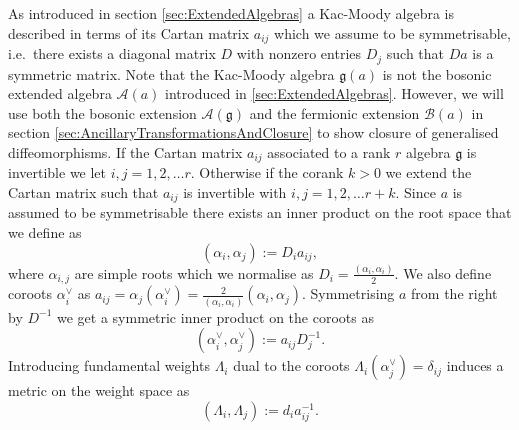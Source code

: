 As introduced in section \ref{sec:ExtendedAlgebras} a Kac-Moody algebra is described in terms of its Cartan matrix $a_{ij}$ which we assume to be symmetrisable, i.e.\ there exists a diagonal matrix $D$ with nonzero entries $D_j$ such that $Da$ is a symmetric matrix. Note that the Kac-Moody algebra $\mathfrak{g}(a)$ is not the bosonic extended algebra $\mathscr{A}(a)$ introduced in \ref{sec:ExtendedAlgebras}. However, we will use both the bosonic extension $\mathscr{A}(\mathfrak{g})$ and the fermionic extension $\mathscr{B}(a)$ in section \ref{sec:AncillaryTransformationsAndClosure} to show closure of generalised diffeomorphisms. If the Cartan matrix $a_{ij}$ associated to a rank $r$ algebra $\mathfrak{g}$ is invertible we let $i,j=1,2,\ldots r$. Otherwise if the corank $k>0$ we extend the Cartan matrix such that $a_{ij}$ is invertible with $i,j=1,2,\ldots r+k$. Since $a$ is assumed to be symmetrisable there exists an inner product on the root space that we define as 
\begin{equation}
    (\alpha_i,\alpha_j) := D_ia_{ij},
\end{equation}
where $\alpha_{i,j}$ are simple roots which we normalise as $D_i=\frac{(\alpha_i,\alpha_i)}{2}$. We also define coroots $\alpha_i^\vee$ as $a_{ij} =\alpha_j(\alpha_i^\vee) = \frac{2}{(\alpha_i,\alpha_i)}(\alpha_i,\alpha_j)$. Symmetrising $a$ from the right by $D^{-1}$ we get a symmetric inner product on the coroots as 
\begin{equation}
    (\alpha_i^\vee,\alpha_j^\vee) := a_{ij}D^{-1}_j. 
\end{equation}
Introducing fundamental weights $\Lambda_i$ dual to the coroots $\Lambda_i(\alpha_j^\vee)=\delta_{ij}$ induces a metric on the weight space as 
\begin{equation}
    (\Lambda_i,\Lambda_j) := d_ia^{-1}_{ij}.
\end{equation}



